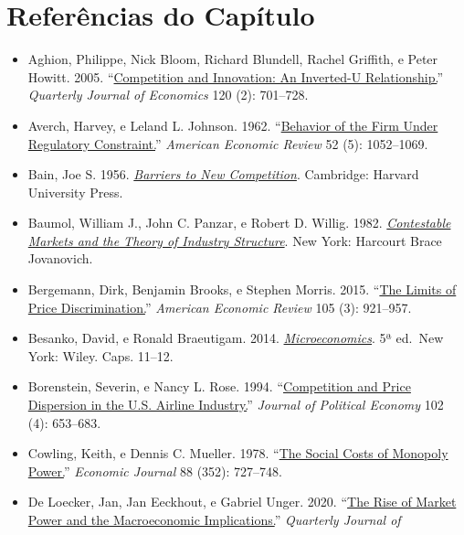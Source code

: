 \documentclass[11pt,twoside,openright]{book}
\providecommand{\tightlist}{\setlength{\itemsep}{0pt}\setlength{\parskip}{0pt}}
\begin{document}
\section{Referências do Capítulo}\label{referuxeancias-do-capuxedtulo-1}

\begin{itemize}
\tightlist
\item
  Aghion, Philippe, Nick Bloom, Richard Blundell, Rachel Griffith, e
  Peter Howitt. 2005.
  ``\href{https://doi.org/10.1093/qje/120.2.701}{Competition and
  Innovation: An Inverted-U Relationship.}'' \emph{Quarterly Journal of
  Economics} 120 (2): 701--728.
\item
  Averch, Harvey, e Leland L. Johnson. 1962.
  ``\href{https://doi.org/10.2307/1812181}{Behavior of the Firm Under
  Regulatory Constraint.}'' \emph{American Economic Review} 52 (5):
  1052--1069.
\item
  Bain, Joe S. 1956.
  \href{https://books.google.com/books/about/Barriers_to_New_Competition.html?id=KyFCAAAAIAAJ}{\emph{Barriers
  to New Competition}}. Cambridge: Harvard University Press.
\item
  Baumol, William J., John C. Panzar, e Robert D. Willig. 1982.
  \href{https://books.google.com/books/about/Contestable_Markets_and_the_Theory_of_In.html?id=N2c6AAAAIAAJ}{\emph{Contestable
  Markets and the Theory of Industry Structure}}. New York: Harcourt
  Brace Jovanovich.
\item
  Bergemann, Dirk, Benjamin Brooks, e Stephen Morris. 2015.
  ``\href{https://doi.org/10.1257/aer.20130848}{The Limits of Price
  Discrimination.}'' \emph{American Economic Review} 105 (3): 921--957.
\item
  Besanko, David, e Ronald Braeutigam. 2014.
  \href{https://books.google.com.br/books?id=BeoengEACAAJ}{\emph{Microeconomics}}.
  5ª ed.~New York: Wiley. Caps. 11--12.
\item
  Borenstein, Severin, e Nancy L. Rose. 1994.
  ``\href{https://doi.org/10.1086/261950}{Competition and Price
  Dispersion in the U.S. Airline Industry.}'' \emph{Journal of Political
  Economy} 102 (4): 653--683.
\item
  Cowling, Keith, e Dennis C. Mueller. 1978.
  ``\href{https://doi.org/10.2307/2231972}{The Social Costs of Monopoly
  Power.}'' \emph{Economic Journal} 88 (352): 727--748.
\item
  De Loecker, Jan, Jan Eeckhout, e Gabriel Unger. 2020.
  ``\href{https://doi.org/10.1093/qje/qjz041}{The Rise of Market Power
  and the Macroeconomic Implications.}'' \emph{Quarterly Journal of
}
\end{itemize}
\end{document}
